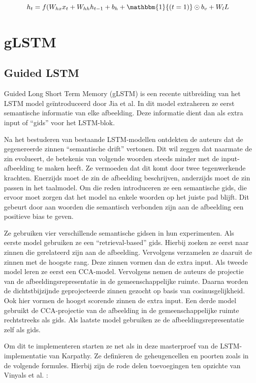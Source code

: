 \begin{equation}
    h_t = f(W_{hx} x_{t} + W_{hh} h_{t-1} + b_h + \mathbbm{1}{(t=1)} \odot b_v + W_lL
    \label{eq:rnnldaall}
\end{equation}


\section{gLSTM}
\subsection{Guided LSTM}
Guided Long Short Term Memory (gLSTM) is een recente uitbreiding van het LSTM model ge\"introduceerd door Jia et al.\cite{Fernando2015} In dit model extraheren ze eerst semantische informatie van elke afbeelding. Deze informatie dient dan als extra input of ``gids'' voor het LSTM-blok.

Na het bestuderen van bestaande LSTM-modellen ontdekten de auteurs dat de gegenereerde zinnen ``semantische drift'' vertonen. Dit wil zeggen dat naarmate de zin evolueert, de betekenis van volgende woorden steeds minder met de input-afbeelding te maken heeft. Ze vermoeden dat dit komt door twee tegenwerkende krachten. Enerzijds moet de zin de afbeelding beschrijven, anderzijds moet de zin passen in het taalmodel. Om die reden introduceren ze een semantische gids, die ervoor moet zorgen dat het model na enkele woorden op het juiste pad blijft. Dit gebeurt door aan woorden die semantisch verbonden zijn aan de afbeelding een positieve bias te geven.

Ze gebruiken vier verschillende semantische gidsen in hun experimenten. Als eerste model gebruiken ze een ``retrieval-based'' gids. Hierbij zoeken ze eerst naar zinnen die gerelateerd zijn aan de afbeelding. Vervolgens verzamelen ze daaruit de zinnen met de hoogste rang. Deze zinnen vormen dan de extra input.
Als tweede model leren ze eerst een CCA-model. Vervolgens nemen de auteurs de projectie van de afbeeldingsrepresentatie in de gemeenschappelijke ruimte. Daarna worden de dichtstbijzijnde geprojecteerde zinnen gezocht op basis van cosinusgelijkheid. Ook hier vormen de hoogst scorende zinnen de extra input.
Een derde model gebruikt de CCA-projectie van de afbeelding in de gemeenschappelijke ruimte rechtstreeks als gids.
Als laatste model gebruiken ze de afbeeldingsrepresentatie zelf als gids.

Om dit te implementeren starten ze net als in deze masterproef van de LSTM-implementatie van Karpathy. Ze defin\"ieren de geheugencellen en poorten zoals in de volgende formules. Hierbij zijn de rode delen toevoegingen ten opzichte van Vinyals et al.\cite{Google} :

